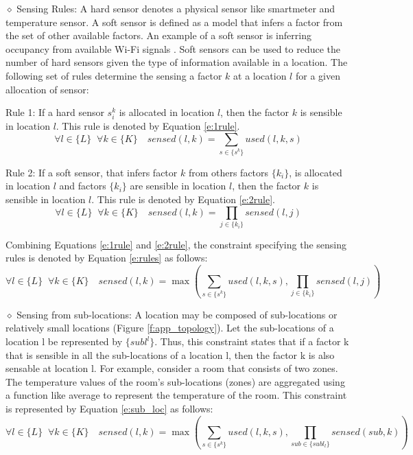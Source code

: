 \documentclass[]{interact}
\theoremstyle{plain}%
\theoremstyle{definition}
\theoremstyle{remark}
\begin{document}
\noindent $\diamond$ Sensing Rules: A hard sensor denotes a physical sensor like smartmeter and temperature sensor. 
A soft sensor is defined as a model that infers a factor from the set of other available factors. An example of a soft sensor is inferring occupancy from available Wi-Fi signals \citep{occupancy_wifi}.  
Soft sensors can be used to reduce the number of hard sensors given the type of information available in a location.  
The following set of rules determine the sensing a factor $k$ at a location $l$ for a given allocation of sensor: %

  \noindent Rule 1: If a hard sensor $s_i^k$ is allocated in location $l$, then the factor $k$ is sensible in location $l$. 
  This rule is denoted by Equation \eqref{e:1rule}.
\begin{equation}
  \label{e:1rule}
  \forall l \in \{L\} \;\; \forall k \in \{K\} \quad sensed(l,k) = 
  \sum_{s \in \{s^k\}}  used(l,k,s)  
  \end{equation}

  \noindent Rule 2: If a soft sensor, that infers factor $k$ from others factors $\{k_i\}$, is allocated in location $l$ and factors $\{k_i\}$ are sensible in location $l$, then the factor $k$ is sensible in location $l$.
  This rule is denoted by Equation \eqref{e:2rule}.
\begin{equation}
  \label{e:2rule}
  \forall l \in \{L\} \;\; \forall k \in \{K\} \quad sensed(l,k) = 
  \prod_{j \in \{k_i\}} sensed(l,j)
  \end{equation}

Combining Equations \eqref{e:1rule} and \eqref{e:2rule}, the constraint specifying the sensing rules is denoted by Equation \eqref{e:rules} as follows: 
\begin{equation}
  \label{e:rules}
  \forall l \in \{L\} \;\; \forall k \in \{K\} \quad sensed(l,k) = \max \left(
  \sum_{s \in \{s^k\}}  used(l,k,s) , 
  \prod_{j \in \{k_i\}} sensed(l,j)
  \right)
  \end{equation}

  \noindent $\diamond$ Sensing from sub-locations: A location may be composed of sub-locations or relatively small locations (Figure \ref{f:app_topology}). Let the sub-locations of a location l be represented by $\{subl^l\}$. Thus, this constraint states that if a factor k that is sensible in all the sub-locations of a location l, then the factor k is also sensable at location l. For example, consider a room that consists of two zones. 
  The temperature values of the room's sub-locations (zones) are aggregated using a function like average to represent the temperature of the room.
  This constraint is represented by Equation \eqref{e:sub_loc} as follows:
\begin{equation}
    \label{e:sub_loc}
    \forall l \in \{L\} \;\; \forall k \in \{K\} \quad sensed(l,k) = \max \left(
  \sum_{s \in \{s^k\}}  used(l,k,s) , 
  \prod_{sub \in \{subl_l\}} sensed(sub,k)
  \right)
  \end{equation}
\end{document}
